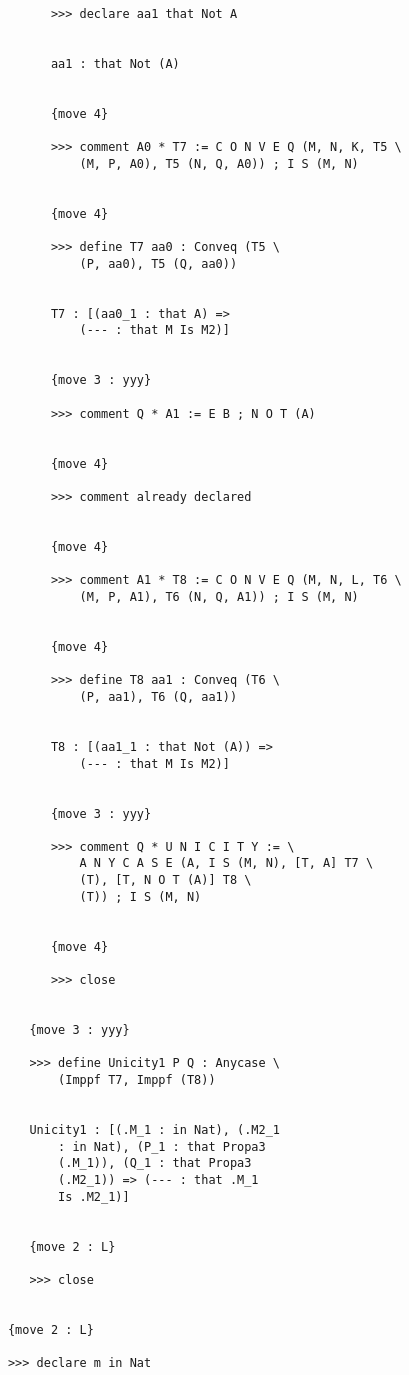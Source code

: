 \documentclass{article}
\begin{document}
\begin{verbatim}
            >>> declare aa1 that Not A


            aa1 : that Not (A)


            {move 4}

            >>> comment A0 * T7 := C O N V E Q (M, N, K, T5 \
                (M, P, A0), T5 (N, Q, A0)) ; I S (M, N)


            {move 4}

            >>> define T7 aa0 : Conveq (T5 \
                (P, aa0), T5 (Q, aa0))


            T7 : [(aa0_1 : that A) => 
                (--- : that M Is M2)]


            {move 3 : yyy}

            >>> comment Q * A1 := E B ; N O T (A)


            {move 4}

            >>> comment already declared


            {move 4}

            >>> comment A1 * T8 := C O N V E Q (M, N, L, T6 \
                (M, P, A1), T6 (N, Q, A1)) ; I S (M, N)


            {move 4}

            >>> define T8 aa1 : Conveq (T6 \
                (P, aa1), T6 (Q, aa1))


            T8 : [(aa1_1 : that Not (A)) => 
                (--- : that M Is M2)]


            {move 3 : yyy}

            >>> comment Q * U N I C I T Y := \
                A N Y C A S E (A, I S (M, N), [T, A] T7 \
                (T), [T, N O T (A)] T8 \
                (T)) ; I S (M, N)


            {move 4}

            >>> close


         {move 3 : yyy}

         >>> define Unicity1 P Q : Anycase \
             (Imppf T7, Imppf (T8))


         Unicity1 : [(.M_1 : in Nat), (.M2_1 
             : in Nat), (P_1 : that Propa3 
             (.M_1)), (Q_1 : that Propa3 
             (.M2_1)) => (--- : that .M_1 
             Is .M2_1)]


         {move 2 : L}

         >>> close


      {move 2 : L}

      >>> declare m in Nat



\end{verbatim}
\end{document}

